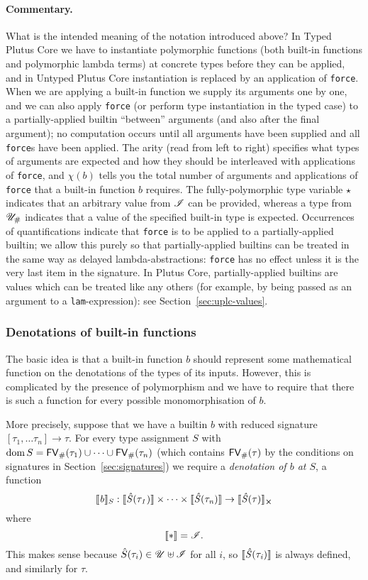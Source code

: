 \paragraph{Commentary.} What is the intended meaning of the notation introduced
above?  In Typed Plutus Core we have to instantiate polymorphic functions (both
built-in functions and polymorphic lambda terms) at concrete types before they
can be applied, and in Untyped Plutus Core instantiation is replaced by an
application of \texttt{force}.  When we are applying a built-in function we
supply its arguments one by one, and we can also apply \texttt{force} (or
perform type instantiation in the typed case) to a partially-applied builtin
``between'' arguments (and also after the final argument); no computation occurs
until all arguments have been supplied and all \texttt{force}s have been
applied. The arity (read from left to right) specifies what types of arguments
are expected and how they should be interleaved with applications of
\texttt{force}, and $\chi(b)$ tells you the total number of arguments and
applications of \texttt{force} that a built-in function $b$ requires. The
fully-polymorphic type variable $\star$ indicates that an arbitrary value from
$\mathscr{I}$ can be provided, whereas a type from ${\mathscr{U}_{\#}}$ indicates that a value
of the specified built-in type is expected. Occurrences of quantifications
indicate that \texttt{force} is to be applied to a partially-applied builtin; we
allow this purely so that partially-applied builtins can be treated in the same
way as delayed lambda-abstractions: \texttt{force} has no effect unless it is
the very last item in the signature.  In Plutus Core, partially-applied
builtins are values which can be treated like any others (for example, by being
passed as an argument to a \texttt{lam}-expression): see
Section~\ref{sec:uplc-values}.


\subsubsection{Denotations of built-in functions}
\label{sec:builtin-denotations}
The basic idea is that a built-in function $b$ should represent some
mathematical function on the denotations of the types of its inputs.  However,
this is complicated by the presence of polymorphism and we have to require that
there is such a function for every possible monomorphisation of $b$.

More precisely, suppose that we have a builtin $b$ with reduced signature
$[\tau_1, \ldots \tau_n] \rightarrow \tau$.  For every type assignment $S$ with
$\operatorname{dom} S = \mathsf{FV}_{\#}(\tau_1) \cup \cdots \cup \mathsf{FV}_{\#}(\tau_n)$ (which contains $\mathsf{FV}_{\#}(\tau)$ by
the conditions on signatures in Section~\ref{sec:signatures}) we require a
\textit{denotation of $b$ at $S$}, a function
$$
\denote{b}_S: \denote{\Sext(\tau_1)} \times \cdots \times \denote{\Sext(\tau_n)} \rightarrow \withError{\denote{\Sext(\tau)}}
$$%
\noindent where
$$
\denote{\star} = \Inputs.
$$
\noindent This makes sense because $\hat{S}(\tau_i) \in \mathscr{U} \uplus
\mathscr{I}$ for all $i$, so $\llbracket\mathit{\hat{S}(\tau_i)}\rrbracket$ is always defined,
and similarly for $\tau$.

